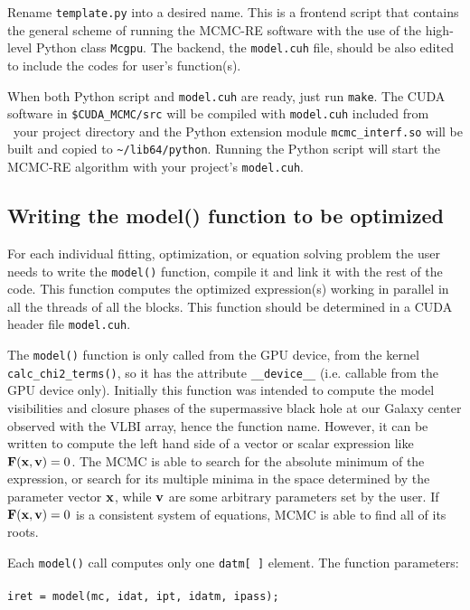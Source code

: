 \documentclass[preprint2]{aastex}
\begin{document}
Rename \verb|template.py|
into a desired name. This is a frontend script that contains the general scheme 
of running the MCMC-RE software with the use of the high-level Python class \verb|Mcgpu|. 
The backend, the \verb|model.cuh| file, should be also edited to include the codes for 
user's function(s). 

When both Python script and 
\verb|model.cuh| are ready, just run \verb|make|. The CUDA software in
\verb|$CUDA_MCMC/src| will be compiled with \verb|model.cuh| included from \
your project directory and the Python extension module \verb|mcmc_interf.so|
will be built and copied to \verb|~/lib64/python|. Running the Python script
will start the MCMC-RE algorithm with your project's \verb|model.cuh|. 


\subsection{Writing the model() function to be optimized}

For each individual fitting, optimization, or equation solving problem the user needs to write the \verb|model()| function, compile it and link it with the rest of the code. This function computes the optimized expression(s) working in parallel in all the threads of all the blocks. This function should be determined in a CUDA header file \verb|model.cuh|.

The \verb|model()| function is only called from the GPU device, from the kernel \\
\verb|calc_chi2_terms()|, so it has the attribute \verb|__device__| (i.e. callable from the GPU device only). Initially this function was intended to compute the model visibilities and closure phases of the supermassive  black hole at our Galaxy center observed with the VLBI array, hence the function name. However, it can be written to compute the left hand side of a vector or scalar expression like ${\bf F}({\bf x}, {\bf v}) = 0$.
The MCMC is able to search for the absolute minimum of the expression, or search for its multiple minima in the space determined by the parameter vector ${\bf x}$, while ${\bf v}$ are some arbitrary parameters set by the user. If ${\bf F}({\bf x}, {\bf v}) = 0$ is a consistent system of equations, MCMC is able to find all of its roots.

Each \verb|model()| call computes only one \verb|datm[ ]| element. 
The function parameters: \\ \\
\verb|iret = model(mc, idat, ipt, idatm, ipass);| \\
\end{document}

